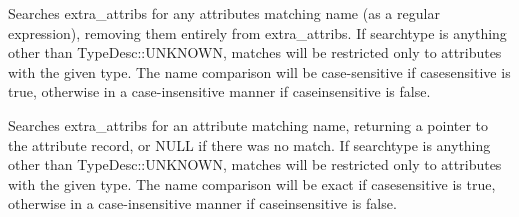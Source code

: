 Searches {\cf extra_attribs} for any attributes matching {\cf name} (as
a regular expression), removing them entirely from {\cf extra_attribs}.
If {\cf searchtype} is anything other than {\cf TypeDesc::UNKNOWN},
matches will be restricted only to attributes with the given type.
The name comparison will be case-sensitive if {\cf casesensitive} is true, otherwise
in a case-insensitive manner if {\cf caseinsensitive} is false.
\apiend


Searches {\cf extra_attribs} for an attribute matching {\cf name},
returning a pointer to the attribute record, or NULL if there was no
match.  If {\cf searchtype} is anything other than {\cf TypeDesc::UNKNOWN},
matches will be restricted only to attributes with the given type.
The name comparison will be exact if {\cf casesensitive} is true, otherwise
in a case-insensitive manner if {\cf caseinsensitive} is false.
\apiend

